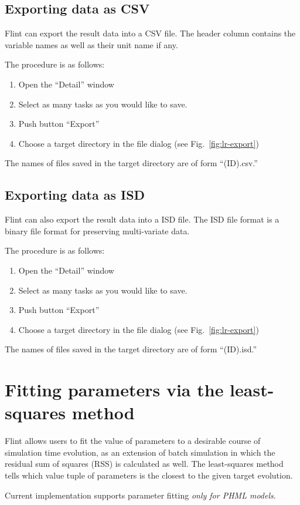 \documentclass[a4paper,10pt]{report}
\begin{document}
\subsection{Exporting data as CSV}
Flint can export the result data into a CSV file.
The header column contains the variable names as well as their unit name if any.

The procedure is as follows:
\begin{enumerate}
\item Open the ``Detail'' window
\item Select as many tasks as you would like to save.
\item Push button ``Export''
\item Choose a target directory in the file dialog (see Fig.~\ref{fig:lr-export})
\end{enumerate}
The names of files saved in the target directory are of form ``(ID).csv.''

\subsection{Exporting data as ISD}
Flint can also export the result data into a ISD file.
The ISD file format is a binary file format for preserving multi-variate data.

The procedure is as follows:
\begin{enumerate}
\item Open the ``Detail'' window
\item Select as many tasks as you would like to save.
\item Push button ``Export''
\item Choose a target directory in the file dialog (see Fig.~\ref{fig:lr-export})
\end{enumerate}
The names of files saved in the target directory are of form ``(ID).isd.''

\section{Fitting parameters via the least-squares method}
Flint allows users to fit the value of parameters to a desirable course of
simulation time evolution, as an extension of batch simulation in which
the residual sum of squares (RSS) is calculated as well. The least-squares
method tells which value tuple of parameters is the closest to the given
target evolution.

Current implementation supports parameter fitting \emph{only for PHML models}.
\end{document}
